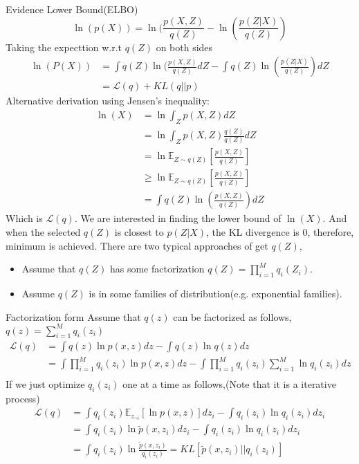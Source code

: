     \begin{frame}[allowframebreaks]{Evidence Lower Bound(ELBO)}
    $$\ln (p(X)) = \ln (\frac{p(X,Z)}{q(Z)} - \ln (\frac{p(Z|X)}{q(Z)})$$
    Taking the expecttion w.r.t $q(Z)$ on both sides
    \begin{align*}
    \ln (P(X)) & = \int q(Z) \ln (\frac{p(X,Z)}{q(Z)} dZ - \int q(Z)\ln (\frac{p(Z|X)}{q(Z)}) dZ \\
    & = \mathcal{L}(q) + KL(q || p)
    \end{align*}
    Alternative derivation using Jensen's inequality:
    \begin{align*}
    \ln (X) & = \ln \int_Z p(X,Z) dZ \\
    & = \ln \int_Z p(X,Z) \frac{q(Z)}{q(Z)} dZ \\
    & = \ln \mathbb{E}_{Z \sim q(Z)} [\frac{p(X,Z)}{q(Z)}] \\
    & \ge \ln \mathbb{E}_{Z \sim q(Z)} [\frac{p(X,Z)}{q(Z)}] \\
    & = \int q(Z) \ln (\frac{p(X,Z)}{q(Z)}) dZ
    \end{align*}
    Which is $\mathcal{L}(q)$. We are interested in finding the lower bound of $\ln(X)$. And when the selected $q(Z)$ is closest to $p(Z|X)$, the KL divergence is 0, therefore, minimum is achieved.
    There are two typical approaches of get $q(Z)$,
    \begin{itemize}
    \item Assume that $q(Z)$ has some factorization $q(Z) = \prod_{i=1}^M q_i(Z_i)$.
    \item Assume $q(Z)$ is in some families of distribution(e.g. exponential families).
    \end{itemize}
    \end{frame}
    \begin{frame}{Factorization form}
    Assume that $q(z)$ can be factorized as follows, $q(z) = \sum_{i=1}^M q_i(z_i)$
    \begin{align*}
    \mathcal{L}(q) & = \int q(z) \ln p(x,z) dz - \int q(z) \ln q(z) dz \\
    & = \int \prod_{i=1}^M q_i(z_i) \ln p(x,z) dz - \int \prod_{i=1}^M q_i(z_i) \sum_{i=1}^M \ln q_i(z_i) dz \\
    \end{align*}
    If we just optimize $q_i(z_i)$ one at a time as follows,(Note that it is a iterative process)
    \begin{align*}
    \mathcal{L}(q) & = \int q_i(z_i)\mathbb{E}_{z_{\neg i}}[\ln p(x,z)]dz_i - \int q_i(z_i) \ln q_i(z_i) dz_i\\
    & = \int q_i(z_i)\ln \tilde{p}(x,z_i)dz_i - \int q_i(z_i) \ln q_i(z_i) dz_i \\
    & = \int q_i(z_i) \ln \frac{\tilde{p}(x,z_i)}{q_i(z_i)} = KL[\tilde{p}(x,z_i) || q_i(z_i)]
    \end{align*}
    \end{frame}
    
